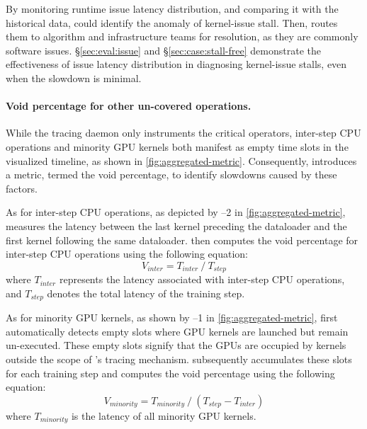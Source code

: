 By monitoring runtime issue latency distribution, and comparing it with the historical data, \sysname{} could identify the anomaly of kernel-issue stall. Then, \sysname{} routes them to algorithm and infrastructure teams for resolution, as they are commonly software issues.
\S\ref{sec:eval:issue} and \S\ref{sec:case:stall-free} demonstrate the effectiveness of issue latency distribution in diagnosing kernel-issue stalls, even when the slowdown is minimal.



\paragraph{\protect{} Void percentage for other un-covered operations.}
While the tracing daemon only instruments the critical operators, inter-step CPU operations and minority GPU kernels both manifest as empty time slots in the visualized timeline, as shown in \autoref{fig:aggregated-metric}.
Consequently, \sysname{} introduces a metric, termed the void percentage, to identify slowdowns caused by these factors.


As for inter-step CPU operations, as depicted by –2 in \autoref{fig:aggregated-metric}, \sysname{} measures the latency between the last kernel preceding the dataloader and the first kernel following the same dataloader. \sysname{} then computes the void percentage for inter-step CPU operations using the following equation:
\begin{equation}
V_{inter} = T_{inter}\ /\ T_{step} 
\end{equation}
where $T_{inter}$ represents the latency associated with inter-step CPU operations, and $T_{step}$ denotes the total latency of the training step.

As for minority GPU kernels, as shown by –1 in \autoref{fig:aggregated-metric}, \sysname{} first automatically detects empty slots where GPU kernels are launched but remain un-executed. These empty slots signify that the GPUs are occupied by kernels outside the scope of \sysname{}’s tracing mechanism. \sysname{} subsequently accumulates these slots for each training step and computes the void percentage using the following equation:
\begin{equation}
V_{minority} = T_{minority}\ /\ (T_{step} - T_{inter})
\end{equation}
where $T_{minority}$ is the latency of all minority GPU kernels.

